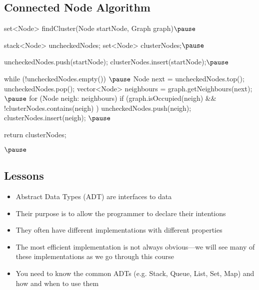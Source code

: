 \begin{slide}
\section[-1]{Connected Node Algorithm}

\begin{java}
set<Node> findCluster(Node startNode, Graph graph)$\pause$
{
  stack<Node> uncheckedNodes;
  set<Node> clusterNodes;$\pause$

  uncheckedNodes.push(startNode);
  clusterNodes.insert(startNode);$\pause$

  while (!uncheckedNodes.empty()) {$\pause$
    Node next = uncheckedNodes.top();   uncheckedNodes.pop();
    vector<Node> neighbours = graph.getNeighbours(next);$\pause$
    for (Node neigh: neighbours) {
      if (graph.isOccupied(neigh) && !clusterNodes.contains(neigh) ) {
        uncheckedNodes.push(neigh);
        clusterNodes.insert(neigh);
      }
    }$\pause$
  }

  return clusterNodes;
}$\pause$
\end{java}
\end{slide}



\begin{slide}
\section{Lessons}

\begin{PauseHighLight}
  \begin{itemize}
  \item Abstract Data Types (ADT) are interfaces to data\pause
  \item Their purpose is to allow the programmer to declare their
    intentions\pause
  \item They often have different implementations with different
    properties\pause
  \item The most efficient implementation is not always
    obvious\pause---we will see many of these implementations as we go
    through this course\pause
  \item You need to know the common ADTs (e.g. Stack, Queue, List, Set,
    Map) and how and when to use them\pause
  \end{itemize}
\end{PauseHighLight}
\end{slide}

